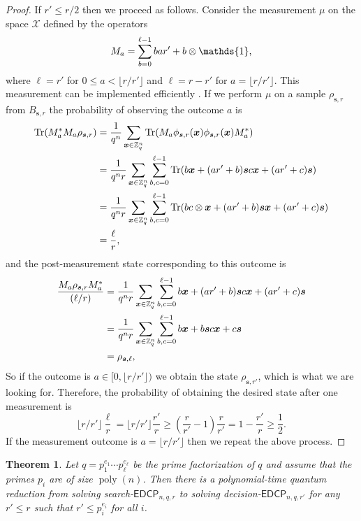 \documentclass[11pt]{article}
\theoremstyle{plain}
\newtheorem{theorem}{Theorem}
\theoremstyle{definition}
\DeclareMathOperator{\tr}{Tr} %
\DeclareMathOperator{\poly}{poly}
\let\ket\relax
\DeclarePairedDelimiter{\ket}{\lvert}{\rangle}
\let\bra\relax
\DeclarePairedDelimiter{\bra}{\langle}{\rvert}
\def\Z{\mathbb{Z}}
\def\edcp{\mathsf{EDCP}}
\begin{document}
\begin{proof}
    If $r' \le r / 2$ then we proceed as follows. Consider the measurement $\mu$ on the space $\mathcal{X}$ defined by the operators
    \[ M_a = \sum_{b = 0}^{\ell - 1} \ket{b}\bra{ar' + b} \otimes \mathds{1}, \]
    where $\ell = r'$ for $0 \le a < \lfloor r / r'  \rfloor$ and $\ell = r - r'$ for $a = \lfloor r / r'  \rfloor$. This measurement can be implemented efficiently \cite{kaye2007introduction}. If we perform $\mu$ on a sample $\rho_{\bm{s}, r}$ from $B_{\bm{s}, r}$ the probability of observing the outcome $a$ is
    \begin{align*}
        \tr(M_a^*M_a \rho_{\bm{s}, r})
        & = \frac{1}{q^n} \sum_{\bm{x} \in \Z_q^n} \tr(M_a \ket{\phi_{\bm{s}, r}(\bm{x})} \bra{\phi_{\bm{s}, r}(\bm{x})} M_a^*) \\
        & = \frac{1}{q^nr} \sum_{\bm{x} \in \Z_q^n} \sum_{b, c = 0}^{\ell - 1} \tr(\ket{b}\ket{\bm{x} + (ar' + b)\bm{s}} \bra{c}\bra{\bm{x} + (ar' + c)\bm{s}}) \\
        & = \frac{1}{q^nr} \sum_{\bm{x} \in \Z_q^n} \sum_{b, c = 0}^{\ell - 1} \tr(\ket{b}\bra{c} \otimes \ket{\bm{x} + (ar' + b)\bm{s}} \bra{\bm{x} + (ar' + c)\bm{s}}) \\
        & = \frac{\ell}{r},
    \end{align*}
    and the post-measurement state corresponding to this outcome is
    \begin{align*}
        \frac{M_a \rho_{\bm{s}, r} M_a^*}{(\ell / r)}
        & = \frac{1}{q^nr} \sum_{\bm{x} \in \Z_q^n} \sum_{b, c = 0}^{\ell - 1} \ket{b}\ket{\bm{x} + (ar' + b)\bm{s}} \bra{c}\bra{\bm{x} + (ar' + c)\bm{s}} \\
        & = \frac{1}{q^nr} \sum_{\bm{x} \in \Z_q^n} \sum_{b, c = 0}^{\ell - 1} \ket{b}\ket{\bm{x} + b\bm{s}} \bra{c}\bra{\bm{x} + c\bm{s}} \\
        & = \rho_{\bm{s}, \ell},
    \end{align*}
    So if the outcome is $a \in [0, \lfloor r / r'  \rfloor)$ we obtain the state $\rho_{\bm{s}, r'}$, which is what we are looking for. Therefore, the probability of obtaining the desired state after one measurement is
    \[ \lfloor r / r' \rfloor \frac{\ell}{r} = \lfloor r / r' \rfloor \frac{r'}{r} \ge \left( \frac{r}{r'} - 1 \right)\frac{r}{r'} = 1 - \frac{r'}{r} \ge \frac{1}{2}. \]
    If the measurement outcome is $a = \lfloor r / r' \rfloor$ then we repeat the above process.
\end{proof}
\begin{theorem}
    Let $q = p_1^{e_1} \cdots p_\ell^{e_\ell}$ be the prime factorization of $q$ and assume that the primes $p_i$ are of size $\poly(n)$. Then there is a polynomial-time quantum reduction from solving search-$\edcp_{n, q, r}$ to solving decision-$\edcp_{n, q, r'}$ for any $r' \le r$ such that $r' \le p_i^{e_i}$ for all $i$. 
\end{theorem}
\end{document}
